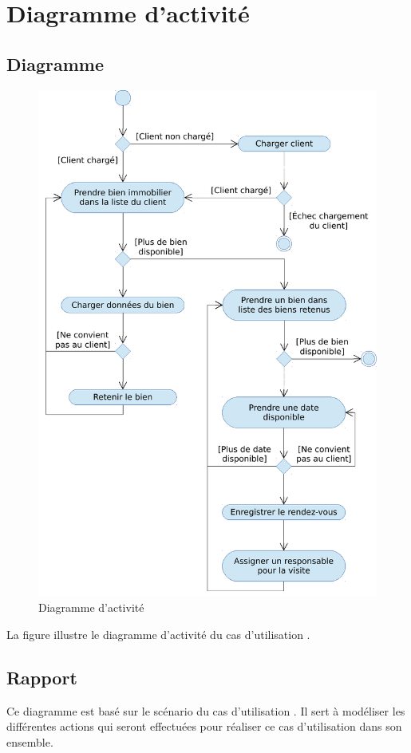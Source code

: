 \chapter{Diagramme d'activité}

\section{Diagramme}

\begin{figure}
  \centering
  \includegraphics[scale=0.67]{IMG/ad}
  \caption{Diagramme d'activité}
  \label{img_ad}
\end{figure}

La figure  illustre le diagramme d'activité du cas d'utilisation \selectedusecase{}.

\section{Rapport}

Ce diagramme est basé sur le scénario du cas d'utilisation \selectedusecase{}. Il sert à modéliser les différentes actions qui seront effectuées pour réaliser ce cas d'utilisation dans son ensemble.